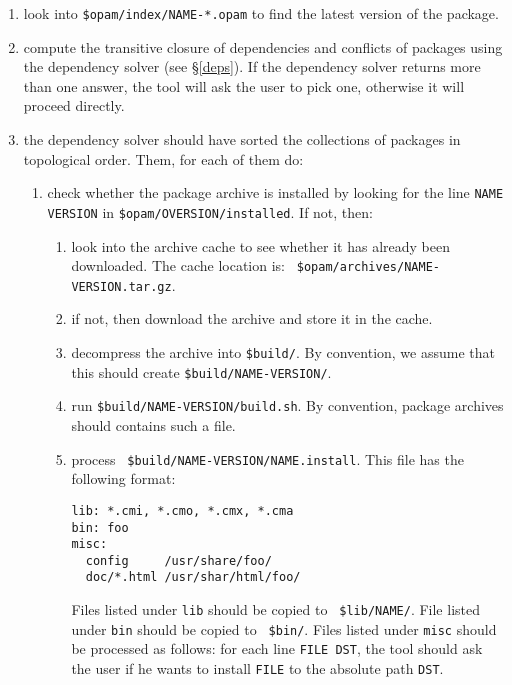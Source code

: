 \documentclass[a4paper,11pt]{article}
\begin{document}
\begin{enumerate}

\item look into {\tt \$opam/index/NAME-*.opam} to find the latest
  version of the package.

\item compute the transitive closure of dependencies and conflicts of
  packages using the dependency solver (see \S\ref{deps}). If the
  dependency solver returns more than one answer, the tool will ask
  the user to pick one, otherwise it will proceed directly.

\item the dependency solver should have sorted the collections of
  packages in topological order. Them, for each of them do:

\begin{enumerate}

\item check whether the package archive is installed by looking for
  the line {\tt NAME VERSION} in {\tt \$opam/OVERSION/installed}. If
  not, then:

\begin{enumerate}

\item look into the archive cache to see whether it has already been
  downloaded. The cache location is: {\tt
    \$opam/archives/NAME-VERSION.tar.gz}.

\item if not, then download the archive and store it in the cache.

\item decompress the archive into {\tt \$build/}. By convention, we
  assume that this should create {\tt \$build/NAME-VERSION/}.

\item run {\tt \$build/NAME-VERSION/build.sh}. By convention, package
  archives should contains such a file.

\item process {\tt
  \$build/NAME-VERSION/NAME.install}\label{NAME.install}.  This file
  has the following format:

\begin{verbatim}
lib: *.cmi, *.cmo, *.cmx, *.cma
bin: foo
misc:
  config     /usr/share/foo/
  doc/*.html /usr/shar/html/foo/
\end{verbatim}

Files listed under {\tt lib} should be copied to {\tt
  \$lib/NAME/}. File listed under {\tt bin} should be copied to {\tt
  \$bin/}. Files listed under {\tt misc} should be processed as
follows: for each line {\tt FILE DST}, the tool should ask the user if
he wants to install {\tt FILE} to the absolute path {\tt DST}.

\end{enumerate}
\end{enumerate}
\end{enumerate}
\end{document}

